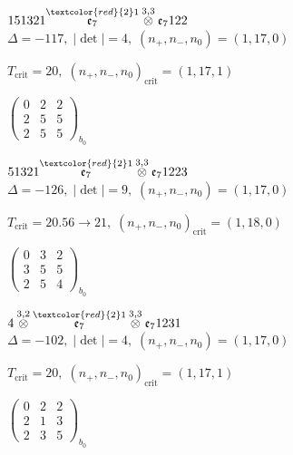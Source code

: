 \documentclass[10pt]{article}
\begin{document}
\smallskip

$151321\overset{\textcolor{red}{2}1}{\mathfrak{e}_7}\overset{3,3}{\otimes}\mathfrak{e}_7122$ \quad $\Delta=-117,\; |\det|=4,\; (n_+,n_-,n_0)=(1,17,0)$

\hspace{1em}$T_{\text{crit}}=20,\; (n_+,n_-,n_0)_{\text{crit}}=(1,17,1)$

\hspace{2em}$\left(\begin{smallmatrix}0 & 2 & 2 \\ 2 & 5 & 5 \\ 2 & 5 & 5\end{smallmatrix}\right)_{\!b_0}$

\smallskip

$51321\overset{\textcolor{red}{2}1}{\mathfrak{e}_7}\overset{3,3}{\otimes}\mathfrak{e}_71223$ \quad $\Delta=-126,\; |\det|=9,\; (n_+,n_-,n_0)=(1,17,0)$

\hspace{1em}$T_{\text{crit}}=20.56 \to 21,\; (n_+,n_-,n_0)_{\text{crit}}=(1,18,0)$

\hspace{2em}$\left(\begin{smallmatrix}0 & 3 & 2 \\ 3 & 5 & 5 \\ 2 & 5 & 4\end{smallmatrix}\right)_{\!b_0}$

\smallskip

$4\overset{3,2}{\otimes}\overset{\textcolor{red}{2}1}{\mathfrak{e}_7}\overset{3,3}{\otimes}\mathfrak{e}_71231$ \quad $\Delta=-102,\; |\det|=4,\; (n_+,n_-,n_0)=(1,17,0)$

\hspace{1em}$T_{\text{crit}}=20,\; (n_+,n_-,n_0)_{\text{crit}}=(1,17,1)$

\hspace{2em}$\left(\begin{smallmatrix}0 & 2 & 2 \\ 2 & 1 & 3 \\ 2 & 3 & 5\end{smallmatrix}\right)_{\!b_0}$
\end{document}
